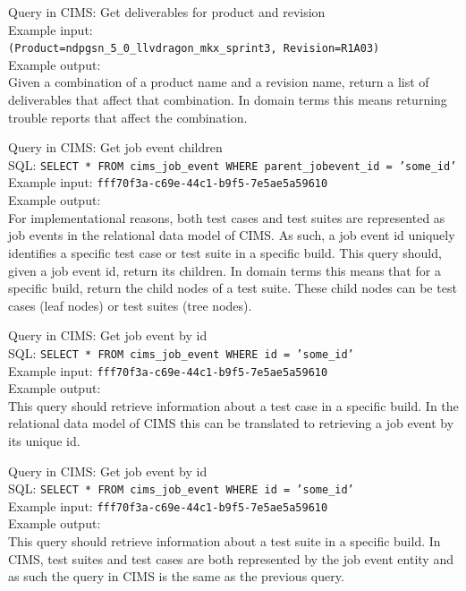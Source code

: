 \label{q:gettrforprod}
Query in CIMS: Get deliverables for product and revision \\
Example input: {\tt (Product=ndpgsn\_5\_0\_llvdragon\_mkx\_sprint3,\ Revision=R1A03) }  \\
Example output: \\
Given a combination of a product name and a revision name, return a list of deliverables that affect that combination. In domain terms this means returning trouble reports that affect the combination.

\label{q:gettestsuitechildren}
Query in CIMS: Get job event children \\
SQL: {\tt SELECT * FROM cims\_job\_event WHERE parent\_jobevent\_id = 'some\_id' }
Example input: {\tt fff70f3a-c69e-44c1-b9f5-7e5ae5a59610 } \\
Example output: \\
For implementational reasons, both test cases and test suites are represented as job events in the relational data model of CIMS. As such, a job event id uniquely identifies a specific test case or test suite in a specific build. This query should, given a job event id, return its children. In domain terms this means that for a specific build, return the child nodes of a test suite. These child nodes can be test cases (leaf nodes) or test suites (tree nodes).


\label{q:gettcinbuild}
Query in CIMS: Get job event by id \\
SQL: {\tt SELECT * FROM cims\_job\_event WHERE id = 'some\_id' } \\
Example input: {\tt fff70f3a-c69e-44c1-b9f5-7e5ae5a59610 } \\
Example output: \\
This query should retrieve information about a test case in a specific build. In the relational data model of CIMS this can be translated to retrieving a job event by its unique id.

\label{q:gettcinbuild}
Query in CIMS: Get job event by id \\
SQL: {\tt SELECT * FROM cims\_job\_event WHERE id = 'some\_id' } \\
Example input: {\tt fff70f3a-c69e-44c1-b9f5-7e5ae5a59610 } \\
Example output: \\
This query should retrieve information about a test suite in a specific build. In CIMS, test suites and test cases are both represented by the job event entity and as such the query in CIMS is the same as the previous query.

